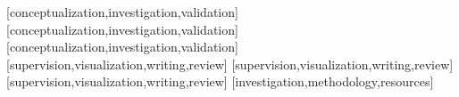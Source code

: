\documentclass[english]{textolivre}
\begin{document}
\printbibliography\label{sec-bib}


\begin{contributors}
[conceptualization,investigation,validation]
[conceptualization,investigation,validation]
[conceptualization,investigation,validation]
[supervision,visualization,writing,review]
[supervision,visualization,writing,review]
[supervision,visualization,writing,review]
[investigation,methodology,resources]
\end{contributors}


\begin{dataavailability}
\end{dataavailability}
\end{document}
